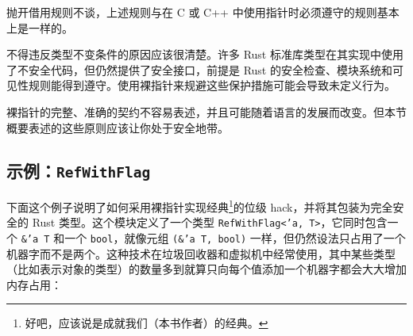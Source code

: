 抛开借用规则不谈，上述规则与在 C 或 C++ 中使用指针时必须遵守的规则基本上是一样的。

不得违反类型不变条件的原因应该很清楚。许多 Rust 标准库类型在其实现中使用了不安全代码，但仍然提供了安全接口，前提是 Rust 的安全检查、模块系统和可见性规则能得到遵守。使用裸指针来规避这些保护措施可能会导致未定义行为。

裸指针的完整、准确的契约不容易表述，并且可能随着语言的发展而改变。但本节概要表述的这些原则应该让你处于安全地带。

\subsection{示例：\texttt{RefWithFlag}}

下面这个例子说明了如何采用裸指针实现经典\footnote{好吧，应该说是成就我们（本书作者）的经典。}的位级 hack，并将其包装为完全安全的 Rust 类型。这个模块定义了一个类型 \texttt{RefWithFlag<'a, T>}，它同时包含一个 \texttt{\&'a T} 和一个 \texttt{bool}，就像元组 \texttt{(\&'a T, bool)} 一样，但仍然设法只占用了一个机器字而不是两个。这种技术在垃圾回收器和虚拟机中经常使用，其中某些类型（比如表示对象的类型）的数量多到就算只向每个值添加一个机器字都会大大增加内存占用：

